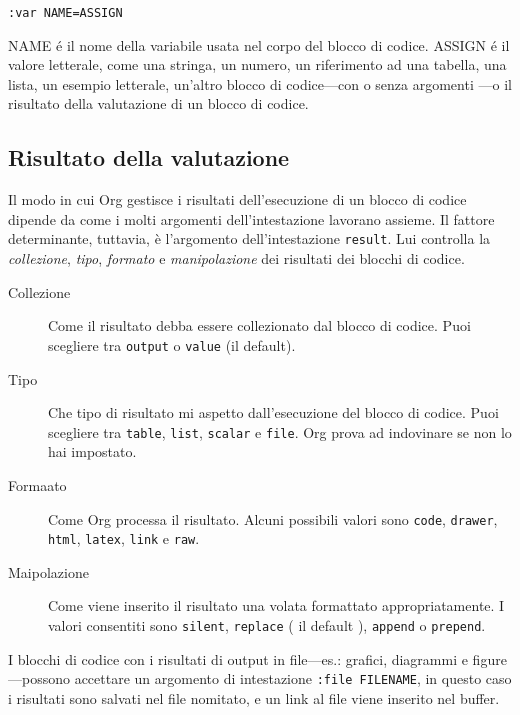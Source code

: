 \documentclass[11pt]{article}
\begin{document}
\begin{verbatim}
:var NAME=ASSIGN
\end{verbatim}


NAME é il nome della variabile usata nel corpo del
blocco di codice. ASSIGN é il valore letterale, come una
stringa, un numero, un riferimento ad una tabella, una lista, un
esempio letterale, un'altro blocco di codice---con o senza argomenti
---o il risultato della valutazione di un blocco di codice.

\subsection*{Risultato della valutazione}
\label{sec:org5d7f2fa}
Il modo in cui Org gestisce i risultati dell'esecuzione di un blocco
di codice dipende da come i molti argomenti dell'intestazione lavorano
assieme. Il fattore determinante, tuttavia, è l'argomento
dell'intestazione \texttt{result}. Lui controlla la \emph{collezione}, \emph{tipo},
\emph{formato} e \emph{manipolazione} dei risultati dei blocchi di codice.

\begin{description}
\item[{Collezione}] Come il risultato debba essere collezionato dal blocco di
codice. Puoi scegliere tra \texttt{output} o \texttt{value} (il default).

\item[{Tipo}] Che tipo di risultato mi aspetto dall'esecuzione del blocco di
codice. Puoi scegliere tra \texttt{table}, \texttt{list}, \texttt{scalar} e \texttt{file}. Org
prova ad indovinare se non lo hai impostato.

\item[{Formaato}] Come Org processa il risultato. Alcuni possibili valori sono \texttt{code},
\texttt{drawer}, \texttt{html}, \texttt{latex}, \texttt{link} e \texttt{raw}.

\item[{Maipolazione}] Come viene inserito il risultato una volata formattato
appropriatamente. I valori consentiti sono \texttt{silent}, \texttt{replace} ( il
default ), \texttt{append} o \texttt{prepend}.
\end{description}

I blocchi di codice con i risultati di output in file---es.:
grafici, diagrammi e figure---possono accettare un argomento di
intestazione \texttt{:file FILENAME}, in questo caso i risultati sono salvati
nel file nomitato, e un link al file viene inserito nel buffer.
\end{document}
